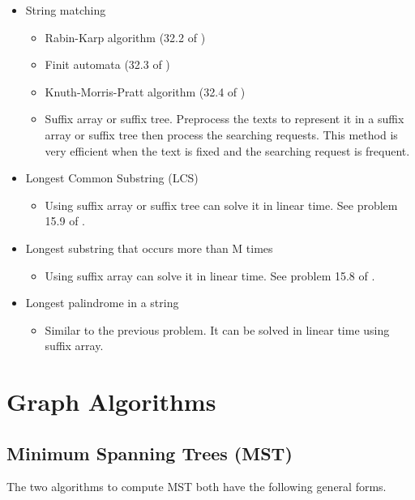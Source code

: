 \documentclass[12pt]{article}
\begin{document}
\begin{itemize}
    \item String matching
        \begin{itemize}
            \item Rabin-Karp algorithm (32.2 of \cite{clrs2})
            \item Finit automata (32.3 of \cite{clrs2})
            \item Knuth-Morris-Pratt algorithm (32.4 of \cite{clrs2})
            \item Suffix array or suffix tree.  Preprocess the texts to
            represent it in a suffix array or suffix tree then process the
            searching requests.  This method is very efficient when the
            text is fixed and the searching request is frequent.
        \end{itemize}
    \item Longest Common Substring (LCS)
        \begin{itemize}
            \item Using suffix array or suffix tree can solve it in linear
            time.  See problem 15.9 of \cite{bently00}.
        \end{itemize}
    \item Longest substring that occurs more than M times
        \begin{itemize}
            \item Using suffix array can solve it in linear time.  See
            problem 15.8 of \cite{bently00}.
        \end{itemize}
    \item Longest palindrome in a string
        \begin{itemize}
            \item Similar to the previous problem.  It can be solved in
            linear time using suffix array.
        \end{itemize}
\end{itemize}

\section{Graph Algorithms}

\subsection{Minimum Spanning Trees (MST)}

The two algorithms to compute MST both have the following general forms.
\end{document}
